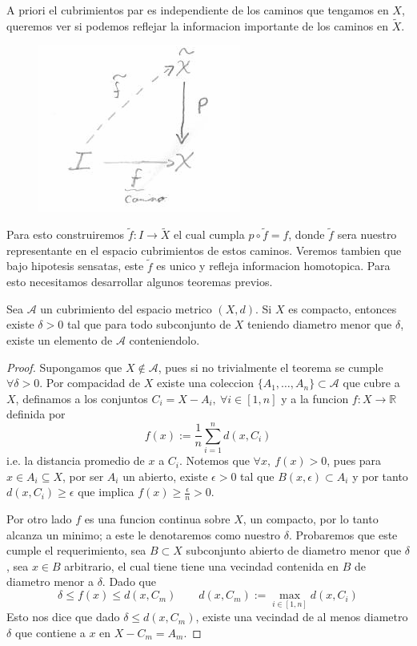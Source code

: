 A priori el cubrimientos par es independiente de los caminos que tengamos
en \(X\), queremos ver si podemos reflejar la informacion importante de
los caminos en \(\tilde{X}\).
\begin{figure}[h]
  \centering
  \includegraphics[scale=0.5]{./imagenes/lifting-path-diagrama.png}
\end{figure}
Para esto construiremos \(\tilde f : I \to \tilde X\) el cual cumpla \(p
\circ \tilde f = f \), donde \(\tilde f\) sera nuestro representante en
el espacio cubrimientos de estos caminos. Veremos tambien que bajo
hipotesis sensatas, este \(\tilde f\) es unico y refleja informacion
homotopica. Para esto necesitamos desarrollar algunos teoremas previos.
\begin{lema} \label{thm:lebesgue-number-lema}
  Sea \(\mathcal A\) un cubrimiento del espacio metrico \((X,d)\). Si
  \(X\) es compacto, entonces existe \(\delta > 0\) tal que para todo
  subconjunto de \(X\) teniendo diametro menor que \(\delta\), existe un
  elemento de \(\mathcal A\) conteniendolo.
\end{lema}
\begin{proof}
  Supongamos que \(X \not \in \mathcal A\), pues si no trivialmente el
  teorema se cumple \(\forall \delta > 0\). Por compacidad de \(X\)
  existe una coleccion \(\{A_1,\dotsc,A_n\} \subset \mathcal A\) que
  cubre a \(X\), definamos a los conjuntos \(C_i = X - A_i,\ \forall i
  \in [1,n]\) y a la funcion \(f : X \to \mathbb R\) definida por
  \[ f(x) := \frac 1 n \sum_{i=1}^{n} d(x, C_i) \]
  i.e. la distancia promedio de \(x\) a \(C_i\). Notemos que \(\forall x,\
  f(x) > 0\), pues para \(x \in A_i \subseteq X\), por ser \(A_i\) un
  abierto, existe \(\epsilon > 0\) tal que \(B(x,\epsilon) \subset A_i\)
  y por tanto \(d(x, C_i) \geq \epsilon\) que implica  \( f(x) \geq \frac
  \epsilon n > 0\).

  Por otro lado \(f\) es una funcion continua sobre \(X\), un compacto,
  por lo tanto alcanza un minimo; a este le denotaremos como nuestro
  \(\delta\). Probaremos que este cumple el requerimiento, sea \(B
  \subset X\) subconjunto abierto de diametro menor que \(\delta\), sea
  \(x \in B\) arbitrario, el cual tiene tiene una vecindad contenida en
  \(B\) de diametro menor a \(\delta\). Dado que
  \[\delta \leq f(x) \leq d(x, C_m) \qquad
      d(x, C_m) := \max_{i \in [1,n]} d(x, C_i)\]
  Esto nos dice que dado \(\delta \leq d(x, C_m)\), existe una vecindad
  de al menos diametro \(\delta\) que contiene a \(x\) en \(X - C_m = A_m\).
\end{proof}
